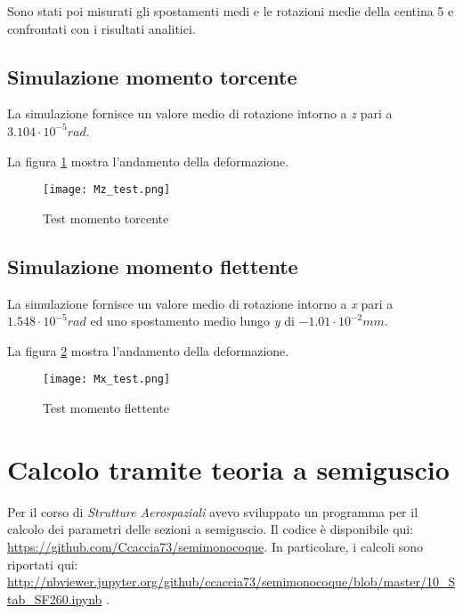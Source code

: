 \documentclass[
10pt, %
a4paper, %
oneside, %
headinclude,footinclude, %
BCOR5mm, %
]{scrartcl}
\begin{document}
Sono stati poi misurati gli spostamenti medi e le rotazioni medie della centina 5 e confrontati con i risultati analitici.

\subsection{Simulazione momento torcente}

La simulazione fornisce un valore medio di rotazione intorno a \emph{z} pari a $3.104\cdot 10^{-5} rad$.

La figura \ref{fig:Mztest} mostra l'andamento della deformazione.

\begin{figure}[htb]
	\centering 
	\texttt{[image: Mz\_test.png]} 
	\caption[Test Mz]{Test momento torcente} %
	\label{fig:Mztest} 
\end{figure}



\subsection{Simulazione momento flettente}

La simulazione fornisce un valore medio di rotazione intorno a \emph{x} pari a $1.548\cdot 10^{-5} rad$ ed uno spostamento medio lungo \emph{y} di $-1.01 \cdot 10^{-2}mm$.

La figura \ref{fig:Mxtest} mostra l'andamento della deformazione.

\begin{figure}[htb]
	\centering 
	\texttt{[image: Mx\_test.png]} 
	\caption[Test Mx]{Test momento flettente} %
	\label{fig:Mxtest} 
\end{figure}

\newpage

\section{Calcolo tramite teoria a semiguscio}

Per il corso di \emph{Strutture Aerospaziali} avevo sviluppato un programma per il calcolo dei parametri delle sezioni a semiguscio. Il codice è disponibile qui: \url{https://github.com/Ccaccia73/semimonocoque}. In particolare, i calcoli sono riportati qui: \url{http://nbviewer.jupyter.org/github/ccaccia73/semimonocoque/blob/master/10_Stab_SF260.ipynb} .
\end{document}
